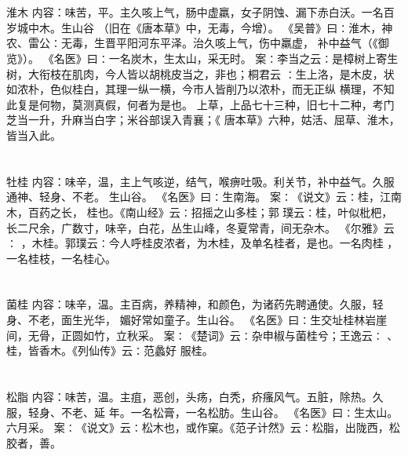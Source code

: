 \documentclass[12pt,UTF8]{ctexbook}
\begin{document}
\chapter{}淮木
内容：味苦，平。主久咳上气，肠中虚羸，女子阴蚀、漏下赤白沃。一名百岁城中木。生山谷 
（旧在《唐本草》中，无毒，今增）。 
《吴普》曰∶淮木，神农、雷公∶无毒，生晋平阳河东平泽。治久咳上气，伤中羸虚， 
补中益气（《御览》）。 
《名医》曰∶一名炭木，生太山，采无时。 
案∶李当之云∶是樟树上寄生树，大衔枝在肌肉，今人皆以胡桃皮当之，非也；桐君云 
∶生上洛，是木皮，状如浓朴，色似桂白，其理一纵一横，今市人皆削乃以浓朴，而无正纵 
横理，不知此复是何物，莫测真假，何者为是也。 
上草，上品七十三种，旧七十二种，考门芝当一升，升麻当白字；米谷部误入青襄；《 
唐本草》六种，姑活、屈草、淮木，皆当入此。 


\chapter{}牡桂
内容：味辛，温，主上气咳逆，结气，喉痹吐吸。利关节，补中益气。久服通神、轻身、不老。 
生山谷。 
《名医》曰∶生南海。 
案∶《说文》云∶桂，江南木，百药之长， 桂也。《南山经》云∶招摇之山多桂；郭 
璞云∶桂，叶似枇杷，长二尺余，广数寸，味辛，白花，丛生山峰，冬夏常青，间无杂木。 
《尔雅》云∶ ，木桂。郭璞云∶今人呼桂皮浓者，为木桂，及单名桂者，是也。一名肉桂 
，一名桂枝，一名桂心。 


\chapter{}菌桂
内容：味辛，温。主百病，养精神，和颜色，为诸药先聘通使。久服，轻身、不老，面生光华， 
媚好常如童子。生山谷。 
《名医》曰∶生交址桂林岩崖间，无骨，正圆如竹，立秋采。 
案∶《楚词》云∶杂申椒与菌桂兮；王逸云∶ 、桂，皆香木。《列仙传》云∶范蠡好 
服桂。 


\chapter{}松脂
内容：味苦，温。主疽，恶创，头疡，白秃，疥瘙风气。五脏，除热。久服，轻身、不老、延 
年。一名松膏，一名松肪。生山谷。 
《名医》曰∶生太山。六月采。 
案∶《说文》云∶松木也，或作窠。《范子计然》云∶松脂，出陇西，松胶者，善。 
\end{document}

